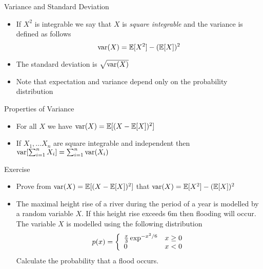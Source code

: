\documentclass{beamer}
\begin{document}
\begin{frame}{Variance and Standard Deviation} 
\begin{itemize} 
 \item If $X^2$ is integrable we say that $X$ is \emph{square integrable} and the variance is defined as follows 
 \begin{displaymath} 
 \mbox{var}(X) = \mathbb{E}[X^2] - (\mathbb{E}[X])^2  
 \end{displaymath}
 \item The standard deviation is $\sqrt{\mbox{var}(X)}$
 \item Note that expectation and variance depend only on the probability distribution 
\end{itemize}
\end{frame}

\begin{frame}{Properties of Variance} 
\begin{itemize} 
 \item For all $X$ we have $\mbox{var}(X) = \mathbb{E}[(X - \mathbb{E}[X])^2]$ 
\item If $X_1, \ldots X_n$ are square integrable and independent then $\mbox{var}[\sum_{i=1}^n X_i] = \sum_{i=1}^n \mbox{var}(X_i)$ 
\end{itemize}
\end{frame}

\begin{frame}{Exercise}  
\begin{itemize}
 \item Prove from  $\mbox{var}(X) = \mathbb{E}[(X - \mathbb{E}[X])^2]$ that $\mbox{var}(X) = \mathbb{E}[X^2] - (\mathbb{E}[X])^2$ 
 \item The maximal height rise of a river during the period of a year is modelled by a random variable $X$. If this height rise exceeds $6$m then flooding will occur. The variable $X$ is modelled using the following distribution 
 \begin{displaymath} 
  p(x) =  \left\{\begin{array}{l l} \frac{x}{3} \exp^{-x^2/6} & x \geq 0 \\ 0 & x < 0 \end{array} \right.  
 \end{displaymath}
 Calculate the probability that a flood occurs. 
\end{itemize}
\end{frame}
\end{document}

